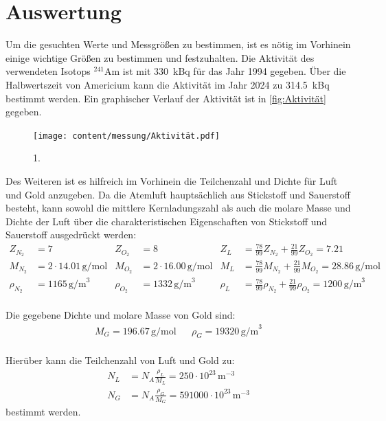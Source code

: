 \section{Auswertung}

Um die gesuchten Werte und Messgrößen zu bestimmen, ist es nötig im Vorhinein einige wichtige Größen zu bestimmen und festzuhalten.
Die Aktivität des verwendeten Isotops $^{241}\mathrm{Am}$ ist mit \SI{330}{\kilo \becquerel} für das Jahr 1994 gegeben.
Über die Halbwertszeit von Americium kann die Aktivität im Jahr 2024 zu \SI{314.5}{\kilo \becquerel} bestimmt werden. Ein graphischer Verlauf der Aktivität ist
in \autoref{fig:Aktivität} gegeben.
\begin{figure}
    \centering
    \texttt{[image: content/messung/Aktivität.pdf]}
    \caption{1.}
    \label{fig:Aktivität}
\end{figure}
Des Weiteren ist es hilfreich im Vorhinein die Teilchenzahl und Dichte für Luft und Gold anzugeben.
Da die Atemluft hauptsächlich aus Stickstoff und Sauerstoff besteht, kann sowohl die mittlere Kernladungszahl als auch die molare Masse und Dichte der Luft 
über die charakteristischen Eigenschaften von Stickstoff und Sauerstoff ausgedrückt werden:
\begin{align*}
Z_{N_2} &= 7 & Z_{O_2} &= 8 & Z_L &= \tfrac{78}{99} Z_{N_2} + \tfrac{21}{99} Z_{O_2} = 7.21 \\
M_{N_2} &= 2 \cdot 14.01 \, \text{g/mol} & M_{O_2} &= 2 \cdot 16.00 \, \text{g/mol} & M_L &= \tfrac{78}{99} M_{N_2} + \tfrac{21}{99} M_{O_2} = 28.86 \, \text{g/mol} \\
\rho_{N_2} &= 1165 \, \text{g/m}^3 & \rho_{O_2} &= 1332 \, \text{g/m}^3 & \rho_L &= \tfrac{78}{99} \rho_{N_2} + \tfrac{21}{99} \rho_{O_2} = 1200 \, \text{g/m}^3 \\
\end{align*}

Die gegebene Dichte und molare Masse von Gold sind:
\begin{align*}
M_G = 196.67 \, \text{g/mol} && \rho_G = 19320 \, \text{g/m}^3 \\
\end{align*}

Hierüber kann die Teilchenzahl von Luft und Gold zu:
\begin{align*}
N_L &= N_A \frac{\rho_L}{M_L} = 250 \cdot 10^{23} \, \text{m}^{-3} \\
N_G &= N_A \frac{\rho_G}{M_G} = 591000 \cdot 10^{23} \, \text{m}^{-3}
\end{align*}
bestimmt werden.


